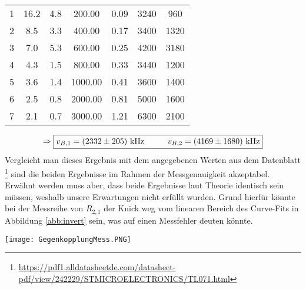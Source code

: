 \begin{center}
\begin{tabular}{l | c c c c | c c}
        \hline
        1 &  16.2 &  4.8 &   200.00 &  0.09 &   3240 &   960 \\    
        2 &   8.5 &  3.3 &   400.00 &  0.17 &   3400 &  1320 \\    
        3 &   7.0 &  5.3 &   600.00 &  0.25 &   4200 &  3180 \\    
        4 &   4.3 &  1.5 &   800.00 &  0.33 &   3440 &  1200 \\    
        5 &   3.6 &  1.4 &  1000.00 &  0.41 &   3600 &  1400 \\    
        6 &   2.5 &  0.8 &  2000.00 &  0.81 &   5000 &  1600 \\    
        7 &   2.1 &  0.7 &  3000.00 &  1.21 &   6300 &  2100 \\
    \end{tabular}
    \label{tab:vB2}
\end{center}
\begin{gather}
    \Rightarrow\boxed{v_{B,1} = (2332 \pm 205)~\text{kHz}\hspace*{1cm} v_{B,2} = (4169 \pm 1680)~\text{kHz}}
\end{gather}
Vergleicht man dieses Ergebnis mit dem angegebenen Werten aus dem Datenblatt \footnote{\url{https://pdf1.alldatasheetde.com/datasheet-pdf/view/242229/STMICROELECTRONICS/TL071.html}} sind die beiden Ergebnisse im Rahmen der Messgenauigkeit akzeptabel. Erwähnt werden muss aber, dass beide Ergebnisse laut Theorie identisch sein müssen, weshalb unsere Erwartungen nicht erfüllt wurden. Grund hierfür könnte bei der Messreihe von $R_{2,1}$ der Knick weg vom linearen Bereich des Curve-Fits in Abbildung \ref{abb:invert} sein, was auf einen Messfehler deuten könnte. 
\begin{center}
    \texttt{[image: GegenkopplungMess.PNG]}
    \label{abb:invert}
\end{center}


